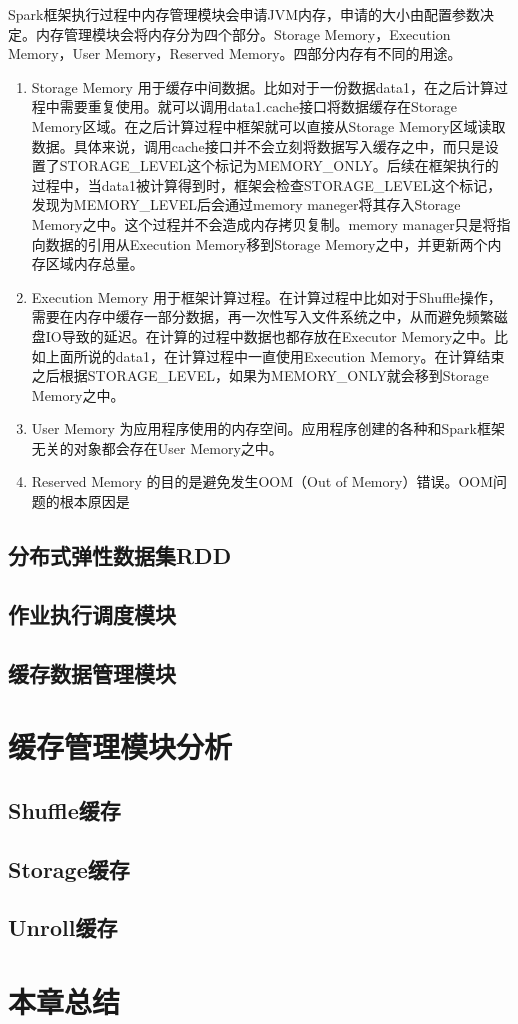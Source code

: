 Spark框架执行过程中内存管理模块会申请JVM内存，申请的大小由配置参数决定。内存管理模块会将内存分为四个部分。Storage Memory，Execution Memory，User Memory，Reserved Memory。四部分内存有不同的用途。

\begin{enumerate}
    \item Storage Memory 用于缓存中间数据。比如对于一份数据data1，在之后计算过程中需要重复使用。就可以调用data1.cache接口将数据缓存在Storage Memory区域。在之后计算过程中框架就可以直接从Storage Memory区域读取数据。具体来说，调用cache接口并不会立刻将数据写入缓存之中，而只是设置了STORAGE_LEVEL这个标记为MEMORY_ONLY。后续在框架执行的过程中，当data1被计算得到时，框架会检查STORAGE_LEVEL这个标记，发现为MEMORY_LEVEL后会通过memory maneger将其存入Storage Memory之中。这个过程并不会造成内存拷贝复制。memory manager只是将指向数据的引用从Execution Memory移到Storage Memory之中，并更新两个内存区域内存总量。
    \item Execution Memory 用于框架计算过程。在计算过程中比如对于Shuffle操作，需要在内存中缓存一部分数据，再一次性写入文件系统之中，从而避免频繁磁盘IO导致的延迟。在计算的过程中数据也都存放在Executor Memory之中。比如上面所说的data1，在计算过程中一直使用Execution Memory。在计算结束之后根据STORAGE_LEVEL，如果为MEMORY_ONLY就会移到Storage Memory之中。
    \item User Memory 为应用程序使用的内存空间。应用程序创建的各种和Spark框架无关的对象都会存在User Memory之中。
    \item Reserved Memory 的目的是避免发生OOM（Out of Memory）错误。OOM问题的根本原因是
\end{enumerate}

\subsection{分布式弹性数据集RDD}
\subsection{作业执行调度模块}
\subsection{缓存数据管理模块}
\section{缓存管理模块分析}
\subsection{Shuffle缓存}
\subsection{Storage缓存}
\subsection{Unroll缓存}
\section{本章总结}





